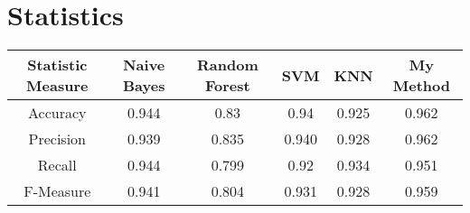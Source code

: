 \documentclass[a4paper,12pt]{article}
\begin{document}
    \section*{Statistics}
        \begin{center}
            \begin{tabular}{| c | c | c | c | c | c |} 
                \hline
                Statistic Measure & Naive Bayes & Random Forest & SVM & KNN & My Method \\ [0.1ex] 
                \hline
                Accuracy & 0.944 & 0.83 & 0.94 & 0.925 & 0.962 \\ 
                \hline
                Precision & 0.939 & 0.835 & 0.940 & 0.928 & 0.962 \\
                \hline
                Recall & 0.944	& 0.799 & 0.92 & 0.934 & 0.951 \\
                \hline
                F-Measure & 0.941 & 0.804 & 0.931 & 0.928 & 0.959 \\
                \hline
            \end{tabular}
        \end{center}
\end{document}
